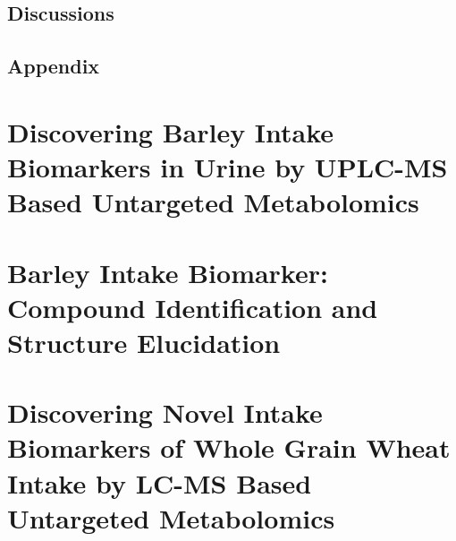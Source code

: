 \documentclass[]{report}
\begin{document}
	\section{Discussions}
	
	\newpage
	\section{Appendix}
	

\chapter{Discovering Barley Intake Biomarkers in Urine by UPLC-MS Based Untargeted Metabolomics}
	

\chapter{Barley Intake Biomarker: Compound Identification and Structure Elucidation}


\chapter{Discovering Novel Intake Biomarkers of Whole Grain Wheat Intake by LC-MS Based Untargeted Metabolomics}


%

%

%

\end{document}
